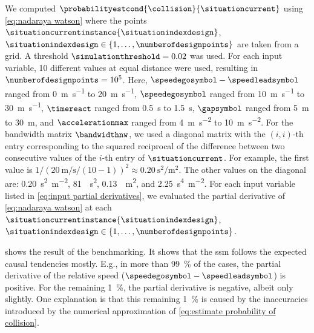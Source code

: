 We computed $\probabilityestcond{\collision}{\situationcurrent}$ using \cref{eq:nadaraya watson} where the points $\situationcurrentinstance{\situationindexdesign}$, $\situationindexdesign\in\{1,\ldots,\numberofdesignpoints\}$ are taken from a grid.
A threshold $\simulationthreshold=0.02$ was used.
For each input variable, 10 different values at equal distance were used, resulting in $\numberofdesignpoints=10^5$.
Here, $\speedegosymbol-\speedleadsymbol$ ranged from \SI{0}{\meter\per\second} to \SI{20}{\meter\per\second}, $\speedegosymbol$ ranged from \SI{10}{\meter\per\second} to \SI{30}{\meter\per\second}, $\timereact$ ranged from \SI{0.5}{\second} to \SI{1.5}{\second}, $\gapsymbol$ ranged from \SI{5}{\meter} to \SI{30}{\meter}, and $\accelerationmax$ ranged from \SI{4}{\meter\per\second\squared} to \SI{10}{\meter\per\second\squared}.
For the bandwidth matrix $\bandwidthnw$, we used a diagonal matrix with the $(i,i)$-th entry corresponding to the squared reciprocal of the difference between two consecutive values of the $i$-th entry of $\situationcurrent$.
For example, the first value is $1/(\SI{20}{\meter\per\second}/(10-1))^2 \approx \SI{0.20}{\second\squared\per\meter\squared}$. 
The other values on the diagonal are: \SI{0.20}{\second\squared\per\meter\squared}, \SI{81}{\per\second\squared}, \SI{0.13}{\per\meter\squared}, and \SI{2.25}{\second\tothe{4}\per\meter\squared}.
For each input variable listed in \cref{eq:input partial derivatives}, we evaluated the partial derivative of \cref{eq:nadaraya watson} at each $\situationcurrentinstance{\situationindexdesign}$, $\situationindexdesign\in\{1,\ldots,\numberofdesignpoints\}$.

 shows the result of the benchmarking. 
It shows that the \ac{ssm} follows the expected causal tendencies mostly. 
E.g., in more than \SI{99}{\%} of the cases, the partial derivative of the relative speed ($\speedegosymbol-\speedleadsymbol$) is positive.
For the remaining \SI{1}{\%}, the partial derivative is negative, albeit only slightly. 
One explanation is that this remaining \SI{1}{\percent} is caused by the inaccuracies introduced by the numerical approximation of \cref{eq:estimate probability of collision}.

